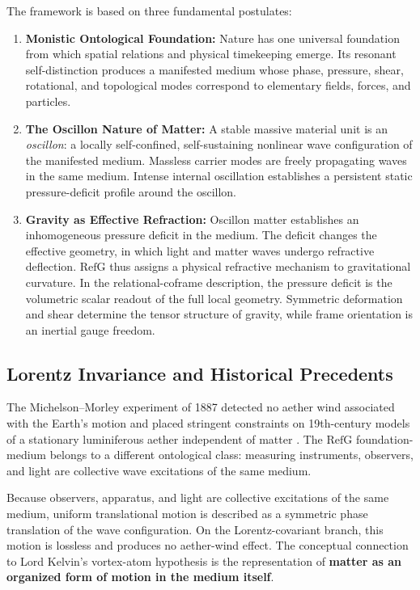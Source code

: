 \documentclass[11pt,a4paper]{article}
\newcommand{\RefG}{\mathrm{RefG}}
\begin{document}
The framework is based on three fundamental postulates:
\begin{enumerate}[label=\arabic*.]
\item \textbf{Monistic Ontological Foundation:} Nature has one universal foundation from which spatial relations and physical timekeeping emerge. Its resonant self-distinction produces a manifested medium whose phase, pressure, shear, rotational, and topological modes correspond to elementary fields, forces, and particles.
\item \textbf{The Oscillon Nature of Matter:} A stable massive material unit is an \emph{oscillon}: a locally self-confined, self-sustaining nonlinear wave configuration of the manifested medium. Massless carrier modes are freely propagating waves in the same medium. Intense internal oscillation establishes a persistent static pressure-deficit profile around the oscillon.
\item \textbf{Gravity as Effective Refraction:} Oscillon matter establishes an inhomogeneous pressure deficit in the medium. The deficit changes the effective geometry, in which light and matter waves undergo refractive deflection. $\RefG$ thus assigns a physical refractive mechanism to gravitational curvature. In the relational-coframe description, the pressure deficit is the volumetric scalar readout of the full local geometry. Symmetric deformation and shear determine the tensor structure of gravity, while frame orientation is an inertial gauge freedom.
\end{enumerate}

\subsection*{Lorentz Invariance and Historical Precedents}

The Michelson--Morley experiment of 1887 detected no aether wind associated with the Earth's motion and placed stringent constraints on 19th-century models of a stationary luminiferous aether independent of matter \citep{michelson1887}. The $\RefG$ foundation-medium belongs to a different ontological class: measuring instruments, observers, and light are collective wave excitations of the same medium.

Because observers, apparatus, and light are collective excitations of the same medium, uniform translational motion is described as a symmetric phase translation of the wave configuration. On the Lorentz-covariant branch, this motion is lossless and produces no aether-wind effect. The conceptual connection to Lord Kelvin's vortex-atom hypothesis \citep{thomson1867} is the representation of \textbf{matter as an organized form of motion in the medium itself}.
\end{document}
